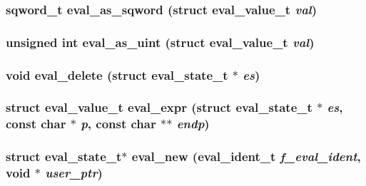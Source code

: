 \subsubsection[{eval\_\-as\_\-sqword}]{\setlength{\rightskip}{0pt plus 5cm}sqword\_\-t eval\_\-as\_\-sqword (struct {\bf eval\_\-value\_\-t} {\em val})}\label{eval_8h_780253281964da3e23b8a92f4cf7e041}


\subsubsection[{eval\_\-as\_\-uint}]{\setlength{\rightskip}{0pt plus 5cm}unsigned int eval\_\-as\_\-uint (struct {\bf eval\_\-value\_\-t} {\em val})}\label{eval_8h_060f5058a15e42755dc7aecd63feba37}


\subsubsection[{eval\_\-delete}]{\setlength{\rightskip}{0pt plus 5cm}void eval\_\-delete (struct {\bf eval\_\-state\_\-t} $\ast$ {\em es})}\label{eval_8h_ecd65c349f912aabe363c400f8a7b8a3}


\subsubsection[{eval\_\-expr}]{\setlength{\rightskip}{0pt plus 5cm}struct {\bf eval\_\-value\_\-t} eval\_\-expr (struct {\bf eval\_\-state\_\-t} $\ast$ {\em es}, \/  const char $\ast$ {\em p}, \/  const char $\ast$$\ast$ {\em endp})\hspace{0.3cm}{\tt  [read]}}\label{eval_8h_8ce87d0deef8161d2407c561f28a440b}


\subsubsection[{eval\_\-new}]{\setlength{\rightskip}{0pt plus 5cm}struct {\bf eval\_\-state\_\-t}$\ast$ eval\_\-new ({\bf eval\_\-ident\_\-t} {\em f\_\-eval\_\-ident}, \/  void $\ast$ {\em user\_\-ptr})\hspace{0.3cm}{\tt  [read]}}\label{eval_8h_ab9da158f1a261f4adfd99feaf2f43a6}


